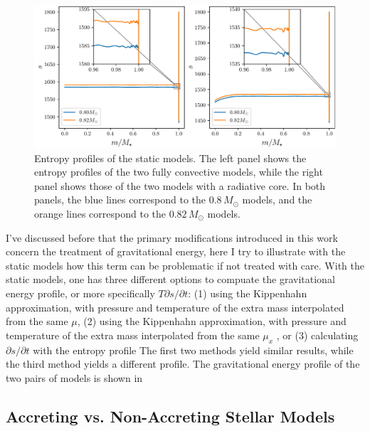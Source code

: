 \documentclass[12pt,a4paper]{article}
\newcommand{\lpfird}[2][]{\partial#1/\partial#2}
\begin{document}
\begin{figure}
  \centering  
  \includegraphics[width=\textwidth,keepaspectratio]{toy_problem_entropy.pdf}
  \caption{Entropy profiles of the static models. The left panel shows the entropy profiles of the two fully convective models, while the right panel shows those of the two models with a radiative core. In both panels, the blue lines correspond to the $0.8\,M_\odot$ models, and the orange lines correspond to the $0.82\,M_\odot$ models.} \label{fig:toy_problem_entropy}
\end{figure}

I've discussed before that the primary modifications introduced in this work concern the treatment of gravitational energy, here I try to illustrate with the static models how this term can be problematic if not treated with care. With the static models, one has three different options to compuate the gravitational energy profile, or more specifically $T\lpfird[s]{t}$: (1) using the Kippenhahn approximation, with pressure and temperature of the extra mass interpolated from the same $\mu$, (2) using the Kippenhahn approximation, with pressure and temperature of the extra mass interpolated from the same $\mu_x$ , or (3) calculating $\lpfird[s]{t}$ with the entropy profile The first two methods yield similar results, while the third method yields a different profile. The gravitational energy profile of the two pairs of models is shown in %

\subsection{Accreting vs. Non-Accreting Stellar Models}
\label{sec:accretion_vs_non_accretion}
\end{document}
